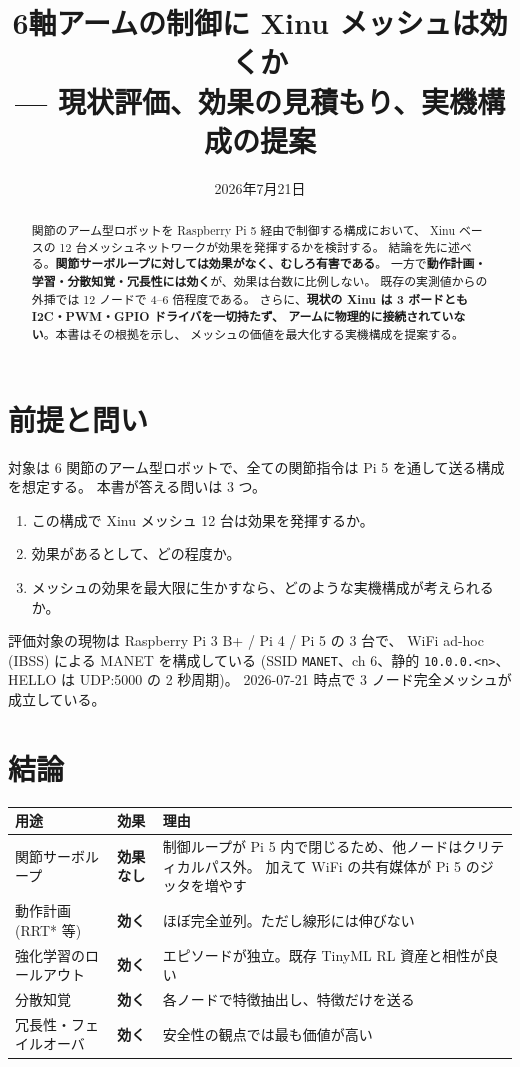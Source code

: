 \documentclass[11pt,a4paper]{article}
\title{6軸アームの制御に Xinu メッシュは効くか\\
       \large --- 現状評価、効果の見積もり、実機構成の提案}
\author{}
\date{2026年7月21日}
\newcommand{\code}[1]{\texttt{#1}}
\newcommand{\prob}[1]{\textbf{\textcolor{red!55!black}{#1}}}
\newcommand{\good}[1]{\textbf{\textcolor{green!45!black}{#1}}}
\begin{document}
\maketitle

\begin{abstract}
 関節のアーム型ロボットを Raspberry Pi 5 経由で制御する構成において、
Xinu ベースの 12 台メッシュネットワークが効果を発揮するかを検討する。
結論を先に述べる。\prob{関節サーボループに対しては効果がなく、むしろ有害である}。
一方で\good{動作計画・学習・分散知覚・冗長性には効く}が、効果は台数に比例しない。
既存の実測値からの外挿では 12 ノードで 4--6 倍程度である。
さらに、\prob{現状の Xinu は 3 ボードとも I2C・PWM・GPIO ドライバを一切持たず、
アームに物理的に接続されていない}。本書はその根拠を示し、
メッシュの価値を最大化する実機構成を提案する。
\end{abstract}

\section{前提と問い}

対象は 6 関節のアーム型ロボットで、全ての関節指令は Pi 5 を通して送る構成を想定する。
本書が答える問いは 3 つ。

\begin{enumerate}[leftmargin=1.6em]
\item この構成で Xinu メッシュ 12 台は効果を発揮するか。
\item 効果があるとして、どの程度か。
\item メッシュの効果を最大限に生かすなら、どのような実機構成が考えられるか。
\end{enumerate}

評価対象の現物は Raspberry Pi 3 B+ / Pi 4 / Pi 5 の 3 台で、
WiFi ad-hoc (IBSS) による MANET を構成している
(SSID \code{MANET}、ch 6、静的 \code{10.0.0.<n>}、HELLO は UDP:5000 の 2 秒周期)。
2026-07-21 時点で 3 ノード完全メッシュが成立している。

\section{結論}

\begin{center}
\begin{tabularx}{\textwidth}{@{}l l X@{}}
\toprule
\textbf{用途} & \textbf{効果} & \textbf{理由}\\
\midrule
関節サーボループ & \prob{効果なし} & 制御ループが Pi 5 内で閉じるため、他ノードはクリティカルパス外。
                                     加えて WiFi の共有媒体が Pi 5 のジッタを増やす\\
動作計画 (RRT* 等) & \good{効く} & ほぼ完全並列。ただし線形には伸びない\\
強化学習のロールアウト & \good{効く} & エピソードが独立。既存 TinyML RL 資産と相性が良い\\
分散知覚 & \good{効く} & 各ノードで特徴抽出し、特徴だけを送る\\
冗長性・フェイルオーバ & \good{効く} & 安全性の観点では最も価値が高い\\
\bottomrule
\end{tabularx}
\end{center}
\end{document}
